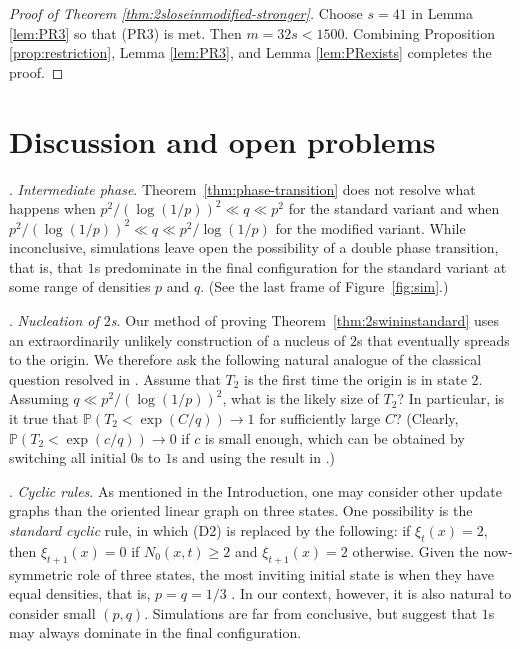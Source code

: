 \documentclass{article}
\renewcommand{\P}{\mathbb{P}}
\numberwithin{equation}{section}
\begin{document}
\begin{proof}[Proof of Theorem \ref{thm:2sloseinmodified-stronger}]
Choose $s = 41$ in Lemma \ref{lem:PR3} so that (PR3) is met.
Then $m = 32s < 1500$.
Combining Proposition \ref{prop:restriction}, Lemma \ref{lem:PR3}, and Lemma \ref{lem:PRexists} completes the proof.
\end{proof}

\section{Discussion and open problems}


. {\it Intermediate phase\/}.
    Theorem~\ref{thm:phase-transition} does not resolve 
    what happens when 
    $p^2/(\log(1/p))^2\ll q \ll p^2$ for the standard variant and when
   $ p^2/(\log(1/p))^2\ll q \ll p^2/\log(1/p)$ for the modified variant. While inconclusive, simulations leave open the possibility of a double phase transition, that is, that 
   $1$s predominate in the final configuration for the standard variant 
   at some range of densities $p$ and $q$. (See the last frame of Figure~\ref{fig:sim}.)
   
   \bigskip
   
. {\it Nucleation of $2$s\/}.
Our method of proving Theorem~\ref{thm:2swininstandard} uses an extraordinarily unlikely construction of a nucleus of $2$s that eventually spreads to the origin. We therefore ask the 
following natural analogue of the classical 
question resolved in \cite{Holroyd2003}. 
Assume that $T_2$ is the first time 
the origin is in state $2$. Assuming $q\ll p^2/(\log(1/p))^2$, 
what is the likely size of $T_2$? In particular, is it true that 
$\P(T_2<\exp(C/q))\to 1$ for sufficiently large $C$? (Clearly, 
$\P(T_2<\exp(c/q))\to 0$ if $c$ is small enough, which can be obtained by switching all initial $0$s to $1$s and using the result in \cite{Holroyd2003}.)

 \bigskip
 
. {\it Cyclic rules\/}.
As mentioned in the Introduction, one may consider other 
update graphs than the oriented linear graph on three states. 
One possibility is the {\it standard  cyclic\/} rule, in which (D2) is replaced by the following: if $\xi_t(x)=2$, then $\xi_{t+1}(x)=0$ if $N_0(x,t)\ge 2$ and $\xi_{t+1}(x)=2$ otherwise. Given the now-symmetric role of three states, the most inviting initial 
state is when they have equal densities, that is, $p=q=1/3$ 
\cite{Fisch1991}. In our context, however, it is also natural to 
consider small $(p,q)$. Simulations are far from conclusive, but 
suggest that $1$s may always dominate 
in the final configuration. 
\end{document}

